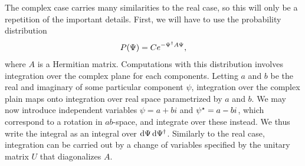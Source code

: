 The complex case carries many similarities to the real case, so this will only be a repetition of the important details. First, we will have to use the probability distribution
\begin{align*}
	P(\Psi) = Ce^{-\Psi^{\dagger} A\Psi},
\end{align*}
where $A$ is a Hermitian matrix. Computations with this distribution involves integration over the complex plane for each components. Letting $a$ and $b$ be the real and imaginary of some particular component $\psi$, integration over the complex plain maps onto integration over real space parametrized by $a$ and $b$. We may now introduce independent variables $\psi = a + bi$ and $\psi^{\star} = a - bi$, which correspond to a rotation in $ab$-space, and integrate over these instead. We thus write the integral as an integral over $\dd{\Psi}\dd{\Psi\ensuremath{^{\dagger}}}$. Similarly to the real case, integration can be carried out by a change of variables specified by the unitary matrix $U$ that diagonalizes $A$.

